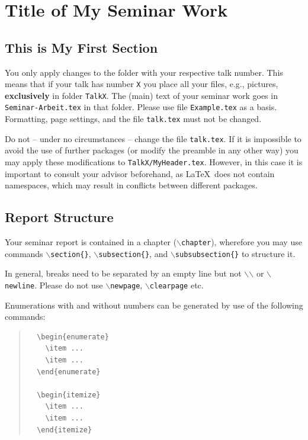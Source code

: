 \chapter{Title of My Seminar Work}


\newpage

\minitoc %

\newpage

\section{This is My First Section}

You only apply changes to the folder with your respective talk number.
This means that if your talk has number \texttt{X} you place all your files, e.g., pictures, \textbf{exclusively} in folder \texttt{TalkX}.
The (main) text of your seminar work goes in \texttt{Seminar-Arbeit.tex} in that folder.
Please use file \texttt{Example.tex} as a basis.
Formatting, page settings, and the file \texttt{talk.tex} must not be changed.

Do not -- under no circumstances -- change the file \texttt{talk.tex}.
If it is impossible to avoid the use of further packages (or modify the preamble in any other way) you may apply these modifications to \texttt{TalkX/MyHeader.tex}.
However, in this case it is important to consult your advisor beforehand, as \LaTeX \ does not contain namespaces, which may result in conflicts between different packages.

\section{Report Structure}

Your seminar report is contained in a chapter (\texttt{$\backslash$chapter}), wherefore you may use commands
\texttt{$\backslash$section\{\}},
\texttt{$\backslash$subsection\{\}}, and
\texttt{$\backslash$subsubsection\{\}}
to structure it.

In general, breaks need to be separated by an empty line but not
\texttt{$\backslash$$\backslash$} or \texttt{$\backslash$newline}. 
Please do not use \texttt{$\backslash$newpage}, \texttt{$\backslash$clearpage} etc.

Enumerations with and without numbers can be generated by use of the following commands:
\begin{quote}
  \begin{verbatim}
  \begin{enumerate}
    \item ...
    \item ...
  \end{enumerate}

  \begin{itemize}
    \item ...
    \item ...
  \end{itemize}
  \end{verbatim}
\end{quote}

